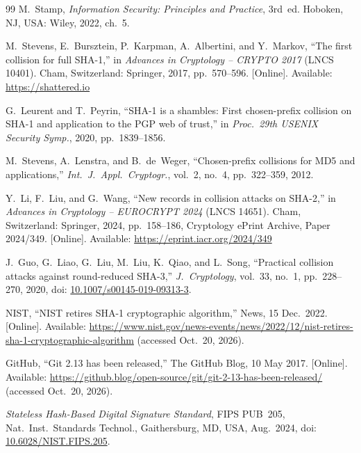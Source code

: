 \documentclass[11pt,a4paper]{article}
\begin{document}
\clearpage
\begin{thebibliography}{99}
\footnotesize\setlength{\itemsep}{1pt}\setlength{\parsep}{0pt}\setlength{\parskip}{0pt}
M.~Stamp, \emph{Information Security: Principles and Practice}, 3rd~ed. Hoboken, NJ, USA: Wiley, 2022, ch.~5.

M.~Stevens, E.~Bursztein, P.~Karpman, A.~Albertini, and Y.~Markov, ``The first collision for full SHA-1,'' in \emph{Advances in Cryptology -- CRYPTO 2017} (LNCS 10401). Cham, Switzerland: Springer, 2017, pp.~570--596. [Online]. Available: \url{https://shattered.io}

G.~Leurent and T.~Peyrin, ``SHA-1 is a shambles: First chosen-prefix collision on SHA-1 and application to the PGP web of trust,'' in \emph{Proc.\ 29th USENIX Security Symp.}, 2020, pp.~1839--1856.

M.~Stevens, A.~Lenstra, and B.~de~Weger, ``Chosen-prefix collisions for MD5 and applications,'' \emph{Int.\ J.\ Appl.\ Cryptogr.}, vol.~2, no.~4, pp.~322--359, 2012.

Y.~Li, F.~Liu, and G.~Wang, ``New records in collision attacks on SHA-2,'' in \emph{Advances in Cryptology -- EUROCRYPT 2024} (LNCS 14651). Cham, Switzerland: Springer, 2024, pp.~158--186, Cryptology ePrint Archive, Paper 2024/349. [Online]. Available: \url{https://eprint.iacr.org/2024/349}

J.~Guo, G.~Liao, G.~Liu, M.~Liu, K.~Qiao, and L.~Song, ``Practical collision attacks against round-reduced SHA-3,'' \emph{J.\ Cryptology}, vol.~33, no.~1, pp.~228--270, 2020, doi: \href{https://doi.org/10.1007/s00145-019-09313-3}{10.1007/s00145-019-09313-3}.

NIST, ``NIST retires SHA-1 cryptographic algorithm,'' News, 15 Dec.~2022. [Online]. Available: \url{https://www.nist.gov/news-events/news/2022/12/nist-retires-sha-1-cryptographic-algorithm} (accessed Oct.~20, 2026).

GitHub, ``Git 2.13 has been released,'' The GitHub Blog, 10 May 2017. [Online]. Available: \url{https://github.blog/open-source/git/git-2-13-has-been-released/} (accessed Oct.~20, 2026).

\emph{Stateless Hash-Based Digital Signature Standard}, FIPS PUB~205, Nat.\ Inst.\ Standards Technol., Gaithersburg, MD, USA, Aug.~2024, doi: \href{https://doi.org/10.6028/NIST.FIPS.205}{10.6028/NIST.FIPS.205}.


\end{thebibliography}
\end{document}

